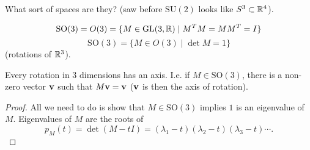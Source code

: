 \documentclass[10pt, a4paper]{article}
\begin{document}
What sort of spaces are they?
(saw before $\mathrm{SU}(2)$ looks like $S ^ 3 \subset \mathbb{R} ^ 4$).

\[
\mathrm{SO}(3) = O(3) = \{M \in \mathrm{GL}(3, \mathbb{R})\mid M ^ TM = MM ^ T = I\}
\]
\[
\mathrm{SO}(3) = \{M \in O(3)\mid\det{M} = 1\}
\]
(rotations of $\mathbb{R} ^ 3$).

\begin{proposition}
    Every rotation in $3$ dimensions has an axis.
    I.e. if $M \in \mathrm{SO}(3)$,
    there is a non-zero vector $\mathbf{v}$ such that $M\mathbf{v} = \mathbf{v}$
    ($\mathbf{v}$ is then the axis of rotation).

    \begin{proof}
        All we need to do is show that $M \in \mathrm{SO}(3)$ implies $1$ is an eigenvalue of $M$.
        Eigenvalues of $M$ are the roots of
        \[
        p_M(t) = \det(M - tI) = (\lambda_1 - t)(\lambda_2 - t)(\lambda_3 - t)\dotsi.
        \]
    \end{proof}
\end{proposition}
\end{document}
